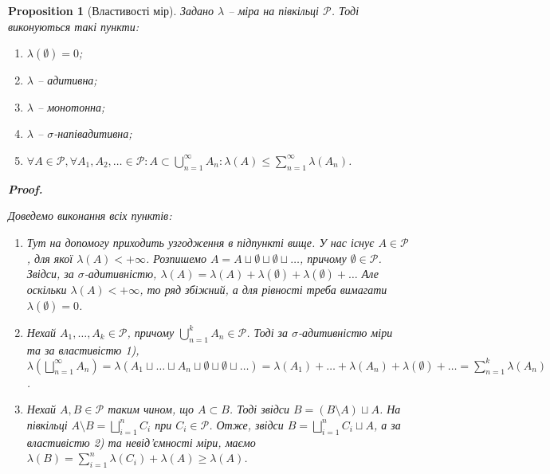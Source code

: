 \documentclass[a4paper, 10pt]{article}
\makeatletter
\theoremstyle{theoremdd}
\newtheorem{proposition}[theorem]{Proposition}
\renewenvironment{proof}[1][Proof.\\]{\par
\pushQED{\hfill \qed}%
\normalfont \topsep6\p@\@plus6\p@\relax
\trivlist
\item\relax
{\bfseries
#1\@addpunct{.}}\hspace\labelsep\ignorespaces
}{%
\popQED\endtrivlist\@endpefalse
}
\makeatother
\begin{document}
\begin{proposition}[Властивості мір]
Задано $\lambda$ -- міра на півкільці $\mathcal{P}$. Тоді виконуються такі пункти:\\
\begin{enumerate}[nosep,wide=0pt,label={\arabic*)}]
\item $\lambda(\emptyset) = 0$;
\item $\lambda$ -- адитивна;
\item $\lambda$ -- монотонна;
\item $\lambda$ -- $\sigma$-напівадитивна;
\item $\forall A \in \mathcal{P}, \forall A_1,A_2,\dots \in \mathcal{P}: A \subset \displaystyle\bigcup_{n=1}^\infty A_n: \lambda(A) \leq \displaystyle\sum_{n=1}^\infty \lambda(A_n)$.
\end{enumerate}

\begin{proof}
Доведемо виконання всіх пунктів:
\begin{enumerate}[wide=0pt, label={\arabic*)}]
\item Тут на допомогу приходить узгодження в підпункті вище. У нас існує $A \in \mathcal{P}$, для якої $\lambda(A) < +\infty$. Розпишемо $A =  A \sqcup \emptyset \sqcup \emptyset \sqcup \dots$, причому $\emptyset \in \mathcal{P}$. Звідси, за $\sigma$-адитивністю, $\lambda(A) = \lambda(A) + \lambda(\emptyset) + \lambda(\emptyset) + \dots$ Але оскільки $\lambda(A) < +\infty$, то ряд збіжний, а для рівності треба вимагати $\lambda(\emptyset) = 0$.

\item Нехай $A_1,\dots,A_k \in \mathcal{P}$, причому $\displaystyle\bigcup_{n=1}^k A_n \in \mathcal{P}$. Тоді за $\sigma$-адитивністю міри та за властивістю 1),\\ $\displaystyle\lambda\left( \bigsqcup_{n=1}^\infty A_n \right) = \lambda(A_1 \sqcup \dots \sqcup A_n \sqcup \emptyset \sqcup \emptyset \sqcup \dots) = \lambda(A_1) + \dots + \lambda(A_n) + \lambda(\emptyset) + \dots = \sum_{n=1}^k \lambda(A_n)$.

\item Нехай $A,B \in \mathcal{P}$ таким чином, що $A \subset B$. Тоді звідси $B = (B \setminus A) \sqcup A$. На півкільці $A \setminus B = \displaystyle\bigsqcup_{i=1}^n C_i$ при $C_i \in \mathcal{P}$. Отже, звідси $B = \displaystyle\bigsqcup_{i=1}^n C_i \sqcup A$, а за властивістю 2) та невід'ємності міри, маємо \\ $\lambda(B) = \displaystyle\sum_{i=1}^n \lambda(C_i) + \lambda(A) \geq \lambda(A)$.


\end{enumerate}
\end{proof}
\end{proposition}
\end{document}
